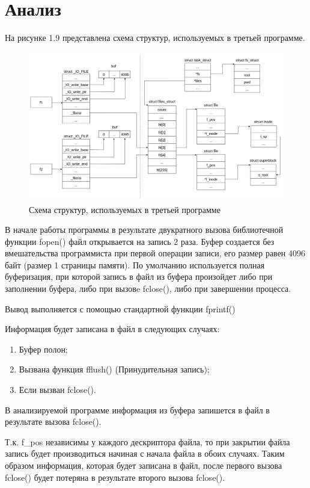 \documentclass[12pt,a4paper]{scrreprt}
\begin{document}
\clearpage
\section{Анализ}

На рисунке 1.9 представлена схема структур, используемых в третьей программе.

\begin{figure}[H]
	\centering
	\includegraphics[scale=0.35]{pics/d3.png}
	\caption{Схема структур, используемых в третьей программе}
\end{figure}	

В начале работы программы в результате двукратного вызова библиотечной функции fopen() файл открывается на запись 2 раза. Буфер создается без вмешательства программиста при первой операции записи, его размер равен 4096 байт (размер 1 страницы памяти). По умолчанию используется полная буферизация, при которой запись в файл из буфера произойдет либо при заполнении буфера, либо при вызовe fclose(), либо при завершении процесса.

Вывод выполняется с помощью стандартной функции fprintf()

Информация будет записана в файл в следующих случаях:
\begin{enumerate}
	\item Буфер полон;
	\item Вызвана функция fflush() (Принудительная запись);
	\item Если вызван fclose().
\end{enumerate} 
  
В анализируемой программе информация из буфера запишется в файл в результате вызова fclose().

Т.к. f\_pos независимы у каждого дескриптора файла, то при закрытии файла запись будет производиться начиная с начала файла в обоих случаях. Таким образом информация, которая будет записана в файл, после первого вызова fclose() будет потеряна в результате второго вызова fclose().

%
	
\end{document}
